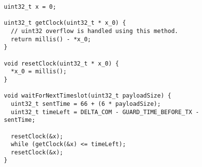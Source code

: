 \begin{figure}[ht]
\begin{lstlisting}[style=customc,caption={The variables and functions used to implement timing.},label={lst:ccrc:timing}]
uint32_t x = 0;

uint32_t getClock(uint32_t * x_0) {
  // uint32 overflow is handled using this method.
  return millis() - *x_0;
}

void resetClock(uint32_t * x_0) {
  *x_0 = millis();
}

void waitForNextTimeslot(uint32_t payloadSize) {
  uint32_t sentTime = 66 + (6 * payloadSize);
  uint32_t timeLeft = DELTA_COM - GUARD_TIME_BEFORE_TX - sentTime;

  resetClock(&x);
  while (getClock(&x) <= timeLeft);
  resetClock(&x);
}

\end{lstlisting}
\vspace{-20pt}
\end{figure}

